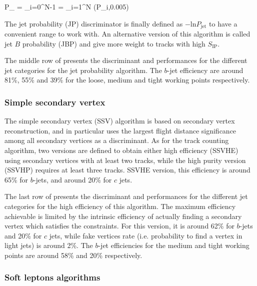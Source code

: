     {
        P_ = \Pi \cdot \sum_{i=0}^{N-1}   \Pi = \prod_{i=1}^{N} (P_{i},0.005)
    }

    The jet probability (JP) discriminator is finally defined as $- \text{ln} P_\text{jet}$
    to have a convenient range to work with. An alternative version of this algorithm is
    called jet $B$ probability (JBP) and give more weight to tracks with high $S_\text{IP}$.

    The middle row of  presents the discriminant and
    performances for the different jet categories for the jet probability algorithm. The
    $b$-jet efficiency are around 81\%, 55\% and 39\% for the loose, medium and tight
    working points respectively.

        \subsubsection{Simple secondary vertex}

    The simple secondary vertex (SSV) algorithm is based on secondary vertex reconstruction,
    and in particular uses the largest flight distance significance among all secondary
    vertices as a discriminant. As for the track counting algorithm, two versions are defined
    to obtain either high efficiency (SSVHE) using secondary vertices with at least two
    tracks, while the high purity version (SSVHP) requires at least three tracks.
    SSVHE version, this efficiency is around 65\% for $b$-jets, and around 20\% for $c$ jets.

    The last row of  presents the discriminant and
    performances for the different jet categories for the high efficiency of this algorithm.
    The maximum efficiency achievable is limited by the intrinsic efficiency of
    actually finding a secondary vertex which satisfies the constraints. For this version,
    it is around 62\% for $b$-jets and 20\% for $c$ jets, while fake vertices rate (i.e.
    probability to find a vertex in light jets) is around 2\%. The $b$-jet efficiencies
    for the medium and tight working points are around 58\% and 20\% respectively.

        \subsubsection{Soft leptons algorithms}

